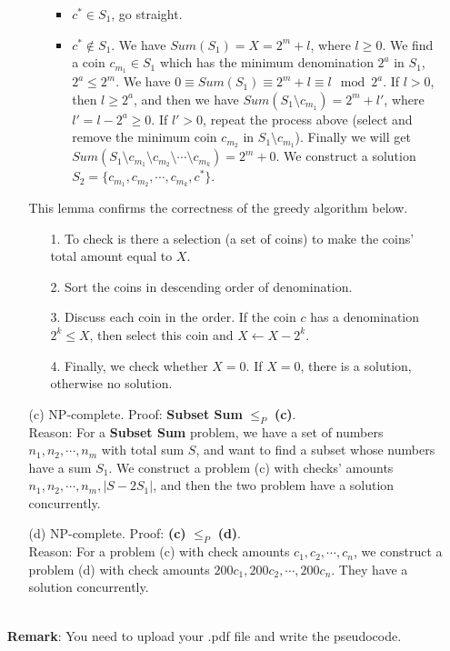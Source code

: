 \documentclass{article}
\begin{document}
\begin{enumerate}
\begin{itemize}
\begin{itemize}
\begin{itemize}
                \item $c^*\in S_1$, go straight.
                \item $c^*\notin S_1$. We have $Sum(S_1)=X=2^m+l$, where $l\geq 0$. We find a coin $c_{m_1}\in S_1$ which has the minimum denomination $2^a$ in $S_1$, $2^a\leq 2^m$. We have $0\equiv Sum(S_1)\equiv 2^m+l\equiv l\mod{2^a}$. If $l>0$, then $l\geq 2^a$, and then we have $Sum(S_1\setminus c_{m_1})=2^m+l'$, where $l'=l-2^a\geq 0$. If $l'>0$, repeat the process above (select and remove the minimum coin $c_{m_2}$ in $S_1\setminus c_{m_1}$). Finally we will get $Sum(S_1\setminus c_{m_1}\setminus c_{m_2}\setminus\cdots\setminus c_{m_k}) = 2^m+0$. We construct a solution $S_2=\{c_{m_1},c_{m_2},\cdots,c_{m_k}, c^*\}$.
            \end{itemize}
        \end{itemize}
        This lemma confirms the correctness of the greedy algorithm below. \begin{itemize}
            \item [1.] To check is there a selection (a set of coins) to make the coins' total amount equal to $X$.
            \item [2.] Sort the coins in descending order of denomination.
            \item [3.] Discuss each coin in the order. If the coin $c$ has a denomination $2^k \leq X$, then select this coin and $X\leftarrow X-2^k$.
            \item [4.] Finally, we check whether $X=0$. If $X=0$, there is a solution, otherwise no solution.
        \end{itemize}
    \item [(c)] NP-complete. Proof: \textbf{Subset Sum} $\leq_P$ \textbf{(c)}.\\Reason: For a \textbf{Subset Sum} problem, we have a set of numbers $n_1,n_2,\cdots,n_m$ with total sum $S$, and want to find a subset whose numbers have a sum $S_1$. We construct a problem (c) with checks' amounts $n_1,n_2,\cdots,n_m, |S-2S_1|$, and then the two problem have a solution concurrently.
    \item [(d)] NP-complete. Proof: \textbf{(c)} $\leq_P$ \textbf{(d)}. \\Reason: For a problem (c) with check amounts $c_1,c_2,\cdots,c_n$, we construct a problem (d) with check amounts $200c_1,200c_2,\cdots,200c_n$. They have a solution concurrently.
\end{itemize}
~\\


\textbf{Remark}: You need to upload your .pdf file and write the pseudocode.
\end{enumerate}
\end{document}
